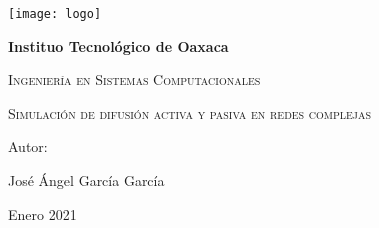 \documentclass{article}
\begin{document}
		
	\begin{titlepage}
		\centering
		{\texttt{[image: logo]}\par}
		\vspace{1cm}
		{\bfseries\LARGE Instituo Tecnológico de Oaxaca \par}
		\vspace{1cm}
		{\scshape\Large Ingeniería en Sistemas Computacionales  \par}
		\vspace{1cm}
		{\scshape\Huge Simulación de difusión activa y pasiva en redes
			complejas \par}
		\vspace{3cm}
		\vfill
		{\Large Autor: \par}
		{\Large José Ángel García García \par}
		\vfill
		{\Large Enero 2021 \par}
		\end{titlepage}
	
\tableofcontents
\newpage
	
\end{document}
